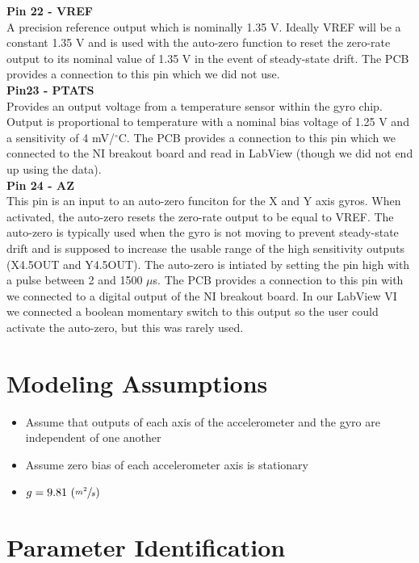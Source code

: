 \documentclass{article}
\theoremstyle{plain}
\theoremstyle{definition}
\theoremstyle{remark}
\begin{document}
\textbf{Pin 22 - VREF}\\
A precision reference output which is nominally 1.35 V. Ideally VREF will be a constant 1.35 V and is used with the auto-zero function to reset the zero-rate output to its nominal value of 1.35 V in the event of steady-state drift. The PCB provides a connection to this pin which we did not use.\\

\textbf{Pin23 - PTATS}\\
Provides an output voltage from a temperature sensor within the gyro chip. Output is proportional to temperature with a nominal bias voltage of 1.25 V and a sensitivity of 4 mV/$^{\circ}$C. The PCB provides a connection to this pin which we connected to the NI breakout board and read in LabView (though we did not end up using the data).\\

\textbf{Pin 24 - AZ}\\
This pin is an input to an auto-zero funciton for the X and Y axis gyros. When activated, the auto-zero resets the zero-rate output to be equal to VREF. The auto-zero is typically used when the gyro is not moving to prevent steady-state drift and is supposed to increase the usable range of the high sensitivity outputs (X4.5OUT and Y4.5OUT). The auto-zero is intiated by setting the pin high with a pulse between 2 and 1500 $\mu$s. The PCB provides a connection to this pin with we connected to a digital output of the NI breakout board. In our LabView VI we connected a boolean momentary switch to this output so the user could activate the auto-zero, but this was rarely used.\\ 

\section{Modeling Assumptions}
\begin{itemize}
\item{Assume that outputs of each axis of the accelerometer and the gyro are independent of one another}
\item{Assume zero bias of each accelerometer axis is stationary} %
\item{$g = 9.81 \, \left( \sfrac{m^2}{s}\right) $}
\end{itemize}

\section{Parameter Identification}
\end{document}
